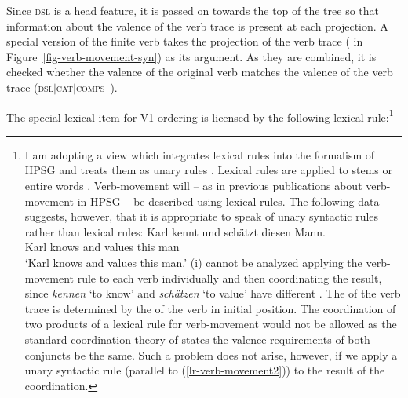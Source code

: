 Since \textsc{dsl} is a head feature, it is passed on towards the top of the tree so that information
about the valence of the verb trace is present at each projection.
A special version of the finite verb takes the projection of the verb trace ( in Figure~\vref{fig-verb-movement-syn}) as its argument. As they are combined,
it is checked whether the valence of the original verb  matches the valence of the verb
trace (\textsc{dsl$|$cat$|$comps} \,).

The special lexical item for V1-ordering is licensed by the following lexical rule:\footnote{\label{fn-koord-vm}%
		I am adopting a view which integrates lexical rules into the formalism of HPSG and treats them as
		unary rules \citep{Meurers2001a}.
		Lexical rules are applied to stems or entire words \citep{Mueller2002b}.
		Verb-movement will -- as in previous publications about verb-movement in HPSG -- be described using 
		lexical rules. The following data suggests, however, that it is appropriate to speak of unary syntactic rules rather than lexical rules:
		 \ea
        \gll Karl kennt und schätzt diesen Mann.\\
             Karl knows and values this man\\
	\glt `Karl knows and values this man.'
        \z
		(i) cannot be analyzed applying the verb-movement rule to each verb individually and then coordinating the
		result, since \emph{kennen} `to know' and \emph{schätzen} `to value' have different \contvs. The \contv
		of the verb trace is determined by the \contv of the verb in initial position. The coordination of two products of
		a lexical rule for verb-movement would not be allowed as the standard coordination theory of \citet[]{ps2} states
		the valence requirements of both conjuncts be the same. Such a problem does not arise, however, if we apply a unary syntactic 
		rule (parallel to (\ref{lr-verb-movement2})) to the result of the coordination.%
}


